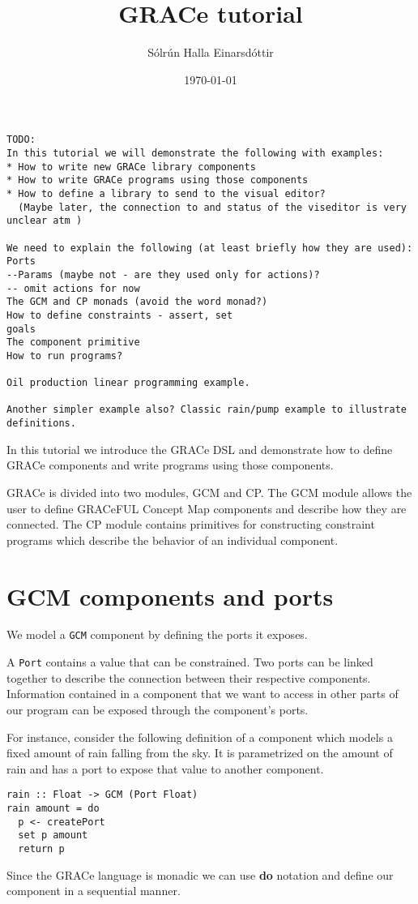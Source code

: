 \documentclass[a4paper,11pt]{article}
\title{GRACe tutorial}
\author{Sólrún Halla Einarsdóttir}
\date{\today}
\begin{document}
\maketitle
\begin{verbatim}
TODO:
In this tutorial we will demonstrate the following with examples:
* How to write new GRACe library components
* How to write GRACe programs using those components
* How to define a library to send to the visual editor?
  (Maybe later, the connection to and status of the viseditor is very unclear atm )

We need to explain the following (at least briefly how they are used):
Ports
--Params (maybe not - are they used only for actions)?
-- omit actions for now
The GCM and CP monads (avoid the word monad?)
How to define constraints - assert, set
goals
The component primitive
How to run programs?

Oil production linear programming example.

Another simpler example also? Classic rain/pump example to illustrate 
definitions.
\end{verbatim}
In this tutorial we introduce the GRACe DSL and demonstrate how to define
GRACe components and write programs using those components.

GRACe is divided into two modules, GCM and CP. The GCM module allows the user
to define GRACeFUL Concept Map components and describe how they are connected.
The CP module contains primitives for constructing constraint programs which
describe the behavior of an individual component.

\section{GCM components and ports}
We model a \texttt{GCM} component by defining the ports it exposes.

A \texttt{Port} contains a value that can be constrained.
Two ports can be linked together to describe the connection between their
respective components.
Information contained in a component that we want to access in other parts
of our program can be exposed through the component's ports.

For instance, consider the following definition of a component which models
a fixed amount of rain falling from the sky.
It is parametrized on the amount of rain and has a port to expose that value
to another component.
\begin{verbatim}
rain :: Float -> GCM (Port Float)
rain amount = do
  p <- createPort
  set p amount
  return p
\end{verbatim}
Since the GRACe language is monadic we can use \textbf{do} notation and define our
component in a sequential manner.
\end{document}
